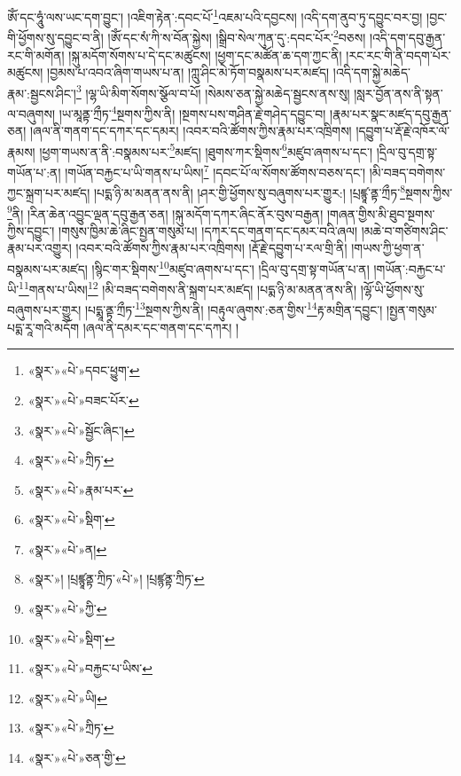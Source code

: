 ཨོཾ་དང་ཧཱུཾ་ལས་ཡང་དག་བྱུང་། །འཇིག་རྟེན་:དབང་པོ་\footnote{«སྣར་»«པེ་»དབང་ཕྱུག་}འཇམ་པའི་དབྱངས། །འདི་དག་ནུབ་ཏུ་དབྱུང་བར་བྱ། །བྱང་གི་ཕྱོགས་སུ་དབྱུང་བ་ནི། །ཨོཾ་དང་སཾ་ཀི་ས་བོན་སྐྱེས། །སྒྲིབ་སེལ་ཀུན་དུ་:དབང་པོར་\footnote{«སྣར་»«པེ་»བཟང་པོར་}བཅས། །འདི་དག་དབུ་རྒྱན་རང་གི་མགོན། །སྐུ་མདོག་སོགས་པ་དེ་དང་མཚུངས། །ཕྱག་དང་མཚོན་ཆ་དག་ཀྱང་ནི། །རང་རང་གི་ནི་བདག་པོར་མཚུངས། །བྱམས་པ་འབའ་ཞིག་གཡས་པ་ན། །ཀླུ་ཤིང་མེ་ཏོག་བསྣམས་པར་མཛད། །འདི་དག་སྐྱེ་མཆེད་རྣམ་:སྦྱངས་ཤིང་།\footnote{«སྣར་»«པེ་»སྦྱོང་ཞིང་།} །ལྷ་ཡི་མིག་སོགས་སྩོལ་བ་པོ། །སེམས་ཅན་སྐྱེ་མཆེད་སྦྱངས་ནས་སུ། །སླར་བྱོན་ནས་ནི་སྟན་ལ་བཞུགས། །ཡ་མཱནྟ་ཀྲྀཏ་\footnote{«སྣར་»«པེ་»ཀྲིཏ་}སྔགས་ཀྱིས་ནི། །སྔགས་པས་གཤིན་རྗེ་གཤེད་དབྱུང་བ། །རྣམ་པར་སྣང་མཛད་དབུ་རྒྱན་ཅན། །ཞལ་ནི་གནག་དང་དཀར་དང་དམར། །འབར་བའི་ཚོགས་ཀྱིས་རྣམ་པར་འཁྲིགས། །དབྱུག་པ་རྡོ་རྗེ་འཁོར་ལོ་རྣམས། །ཕྱག་གཡས་ན་ནི་:བསྣམས་པར་\footnote{«སྣར་»«པེ་»རྣམ་པར་}མཛད། །ཐུགས་ཀར་སྡིགས་\footnote{«སྣར་»«པེ་»སྡིག་}མཛུབ་ཞགས་པ་དང་། །དྲིལ་བུ་དགྲ་སྟ་གཡོན་པ་:ན། །གཡོན་བརྐྱང་པ་ཡི་གནས་པ་ཡིས།\footnote{«སྣར་»«པེ་»ན།} །དབང་པོ་ལ་སོགས་ཚོགས་བཅས་དང་། །མི་བཟད་བགེགས་ཀྱང་སྐྲག་པར་མཛད། །པདྨ་ཉི་མ་མནན་ནས་ནི། །ཤར་གྱི་ཕྱོགས་སུ་བཞུགས་པར་གྱུར:། །པྲཛྙཱ་ནྟ་ཀྲྀཏ་\footnote{«སྣར་»། །པྲཛྙཱནྟ་ཀྲིཏ་«པེ་»། །པྲཛྙནྟ་ཀྲིཏ་}སྔགས་ཀྱིས་\footnote{«སྣར་»«པེ་»ཀྱི་}ནི། །རིན་ཆེན་འབྱུང་ལྡན་དབུ་རྒྱན་ཅན། །སྐུ་མདོག་དཀར་ཞིང་ནོར་བུས་བརྒྱན། །གཞན་གྱིས་མི་ཐུབ་སྔགས་ཀྱིས་དབྱུང་། །གསུས་ཁྱིམ་ཆེ་ཞིང་སྤྱན་གསུམ་པ། །དཀར་དང་གནག་དང་དམར་བའི་ཞལ། །མཆེ་བ་གཙིགས་ཤིང་རྣམ་པར་འགྱུར། །འབར་བའི་ཚོགས་ཀྱིས་རྣམ་པར་འཁྲིགས། །རྡོ་རྗེ་དབྱུག་པ་རལ་གྲི་ནི། །གཡས་ཀྱི་ཕྱག་ན་བསྣམས་པར་མཛད། །སྙིང་གར་སྡིགས་\footnote{«སྣར་»«པེ་»སྡིག་}མཛུབ་ཞགས་པ་དང་། །དྲིལ་བུ་དགྲ་སྟ་གཡོན་པ་ན། །གཡོན་:བརྐྱང་པ་ཡི་\footnote{«སྣར་»«པེ་»བརྐྱང་པ་ཡིས་}གནས་པ་ཡིས།\footnote{«སྣར་»«པེ་»ཡི།} །མི་བཟད་བགེགས་ནི་སྐྲག་པར་མཛད། །པདྨ་ཉི་མ་མནན་ནས་ནི། །ལྷོ་ཡི་ཕྱོགས་སུ་བཞུགས་པར་གྱུར། །པདྨཱ་ནྟ་ཀྲྀཏ་\footnote{«སྣར་»«པེ་»ཀྲིཏ་}སྔགས་ཀྱིས་ནི། །བརྟུལ་ཞུགས་:ཅན་གྱིས་\footnote{«སྣར་»«པེ་»ཅན་གྱི་}རྟ་མགྲིན་དབྱུང་། །སྤྱན་གསུམ་པདྨ་རཱ་གའི་མདོག །ཞལ་ནི་དམར་དང་གནག་དང་དཀར། །

